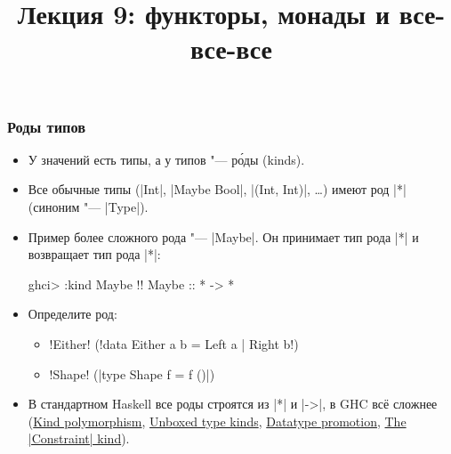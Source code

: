 \documentclass[11pt]{beamer}
\title{Лекция 9: функторы, монады и все-все-все}
\begin{document}
\begin{frame}[plain]
  \maketitle
\end{frame}

\begin{frame}[fragile]
  \frametitle{Роды типов}
  \begin{itemize}
    \item У значений есть типы, а у типов "--- р\'{о}ды (kinds).
    \item Все обычные типы (\haskinline|Int|, \haskinline|Maybe Bool|, \haskinline|(Int, Int)|, \ldots) имеют род \haskinline|*| (синоним "--- \haskinline|Type|).
          \pause
    \item Пример более сложного рода "--- \haskinline|Maybe|. Он принимает тип рода \haskinline|*| и возвращает тип рода \haskinline|*|:
          \begin{haskell}
            ghci> :kind Maybe !\pause!
            Maybe :: * -> *
          \end{haskell}
          \pause
    \item Определите род:
          \begin{itemize}
            \item \haskinline!Either! (\haskinline!data Either a b = Left a | Right b!)
                  \pause
            \item \haskinline!Shape! (\haskinline|type Shape f = f ()|)
                  \pause
          \end{itemize}
    \item В стандартном Haskell все роды строятся из \haskinline|*| и \haskinline|->|, в GHC всё сложнее (\href{https://downloads.haskell.org/~ghc/8.6.3/docs/html/users_guide/glasgow_exts.html#kind-polymorphism}{Kind polymorphism}, \href{https://downloads.haskell.org/~ghc/8.6.3/docs/html/users_guide/glasgow_exts.html#unboxed-types-and-primitive-operations}{Unboxed type kinds}, \href{https://downloads.haskell.org/~ghc/8.6.3/docs/html/users_guide/glasgow_exts.html#datatype-promotion}{Datatype promotion},  \href{https://downloads.haskell.org/~ghc/8.6.3/docs/html/users_guide/glasgow_exts.html#the-constraint-kind}{The \haskinline|Constraint| kind}).
  \end{itemize}
\end{frame}
\end{document}
